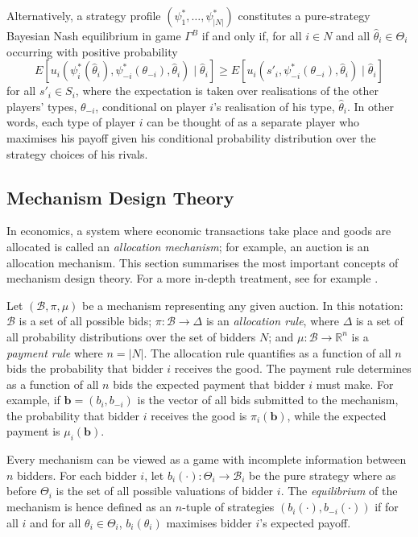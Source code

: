 Alternatively, a strategy profile $(\psi_1^*,\ldots,\psi_{|N|}^*)$ constitutes a pure-strategy Bayesian Nash equilibrium in game $\Gamma^B$ if and only if, for all $i\in N$ and all $\hat{\theta}_i\in\Theta_i$ occurring with positive probability
\begin{equation}
	\label{eq:prop_bayesian_nash_eq_notation}
	E[u_i(\psi^*_i(\hat{\theta}_i),\psi^*_{-i}(\theta_{-i}),\hat{\theta}_i)\mid\hat{\theta}_i] \ge
	E[u_i(s'_i,\psi^*_{-i}(\theta_{-i}),\hat{\theta}_i)\mid\hat{\theta}_i]
\end{equation}
for all $s'_i\in S_i$, where the expectation is taken over realisations of the other players' types, $\theta_{-i}$, conditional on player $i$'s realisation of his type, $\hat{\theta}_i$. In other words, each type of player $i$ can be thought of as a separate player who maximises his payoff given his conditional probability distribution over the strategy choices of his rivals.

\subsection{Mechanism Design Theory} %
\label{sub:mechanism_design_theory_notation}
In economics, a system where economic transactions take place and goods are allocated is called an \emph{allocation mechanism}; for example, an auction is an allocation mechanism. This section summarises the most important concepts of mechanism design theory. For a more in-depth treatment, see for example \cite{MechDesign07,Krishna10,HarrisRaviv1981,HarrisTownsend1975,Myerson1979,Myerson1981}.

Let $(\mathcal{B},\pi,\mu)$ be a mechanism representing any given auction. In this notation: $\mathcal{B}$ is a set of all possible bids; $\pi: \mathcal{B}\to \Delta$ is an \emph{allocation rule}, where $\Delta$ is a set of all probability distributions over the set of bidders $N$; and $\mu:\mathcal{B}\to\mathbb{R}^n$ is a \emph{payment rule} where $n = |N|$. The allocation rule quantifies as a function of all $n$ bids the probability that bidder $i$ receives the good. The payment rule determines as a function of all $n$ bids the expected payment that bidder $i$ must make. For example, if $\mathbf{b}=(b_i,b_{-i})$ is the vector of all bids submitted to the mechanism, the probability that bidder $i$ receives the good is $\pi_i(\mathbf{b})$, while the expected payment is $\mu_i(\mathbf{b})$.

Every mechanism can be viewed as a game with incomplete information between $n$ bidders. For each bidder $i$, let $b_i(\cdot): \Theta_i \to\mathcal{B}_i$ be the pure strategy where as before $\Theta_i$ is the set of all possible valuations of bidder $i$. The \emph{equilibrium} of the mechanism is hence defined as an $n$-tuple of strategies $(b_i(\cdot),b_{-i}(\cdot))$ if for all $i$ and for all $\theta_i\in\Theta_i$, $b_i(\theta_i)$ maximises bidder $i$'s expected payoff.

